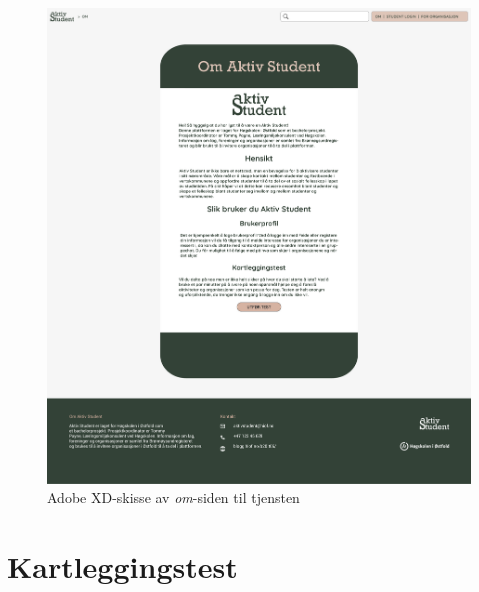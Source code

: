 \begin{figure}[H]
\centering
\includegraphics[width=\textwidth]{Illustrasjoner/Skisser-pdf/3.0/3-11-om-oss.pdf}
\caption{Adobe XD-skisse av {\em om}-siden til tjensten}
\label{vedlegg:3-11-om}
\end{figure}

\section{Kartleggingstest}

